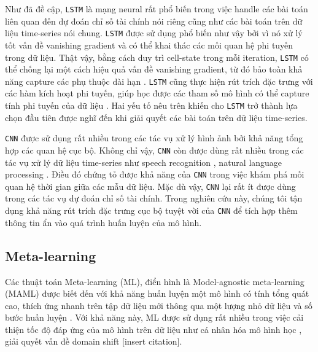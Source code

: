 \documentclass[aps,prb,groupedaddress,twocolumn,showpacs,dvipdfmx, superscriptaddress,pdftex]{revtex4-2}
\begin{document}
Như đã đề cập, \verb|LSTM| là mạng neural rất phổ biến trong việc handle các bài toán liên quan đến dự đoán chỉ số tài chính nói riêng cũng như các bài toán trên dữ liệu time-series nói chung. \verb|LSTM| được sử dụng phổ biến như vậy bởi vì nó xử lý tốt vấn đề vanishing gradient và có thể khai thác các mối quan hệ phi tuyến trong dữ liệu. Thật vậy, bằng cách duy trì cell-state trong mỗi iteration, \verb|LSTM| có thể chống lại một cách hiệu quả vấn đề vanishing gradient, từ đó bảo toàn khả năng capture các phụ thuộc dài hạn \cite{cheng2018applied}. \verb|LSTM| cũng thực hiện rút trích đặc trưng với các hàm kích hoạt phi tuyến, giúp học được các tham số mô hình có thể capture tính phi tuyến của dữ liệu \cite{he2016exploiting}. Hai yếu tố nêu trên khiến cho \verb|LSTM| trở thành lựa chọn đầu tiên được nghĩ đến khi giải quyết các bài toán trên dữ liệu time-series.

\vspace{2mm}

\verb|CNN| được sử dụng rất nhiều trong các tác vụ xử lý hình ảnh \citep{naranjo2020review, sharma2018analysis} bởi khả năng tổng hợp các quan hệ cục bộ. Không chỉ vậy, \verb|CNN| còn được dùng rất nhiều trong các tác vụ xử lý dữ liệu time-series như speech recognition \cite{dua2022developing}, natural language processing \cite{varshitha2023natural}. Điều đó chứng tỏ được khả năng của \verb|CNN| trong việc khám phá mối quan hệ thời gian giữa các mẫu dữ liệu. Mặc dù vậy, \verb|CNN| lại rất ít được dùng trong các tác vụ dự đoán chỉ số tài chính. Trong nghiên cứu này, chúng tôi tận dụng khả năng rút trích đặc trưng cục bộ tuyệt vời của \verb|CNN| để tích hợp thêm thông tin ẩn vào quá trình huấn luyện của mô hình.

\subsection{Meta-learning}

Các thuật toán Meta-learning (ML), điển hình là Model-agnostic meta-learning (MAML) \cite{finn2017model} được biết đến với khả năng huấn luyện một mô hình có tính tổng quát cao, thích ứng nhanh trên tập dữ liệu mới thông qua một lượng nhỏ dữ liệu và số bước huấn luyện \citep{hospedales2021meta, vettoruzzo2024advances}. Với khả năng này, ML được sử dụng rất nhiều trong việc cải thiện tốc độ đáp ứng của mô hình trên dữ liệu như cá nhân hóa mô hình học \cite{fallah2020personalized}, giải quyết vấn đề domain shift [insert citation].

\vspace{2mm}
\end{document}
